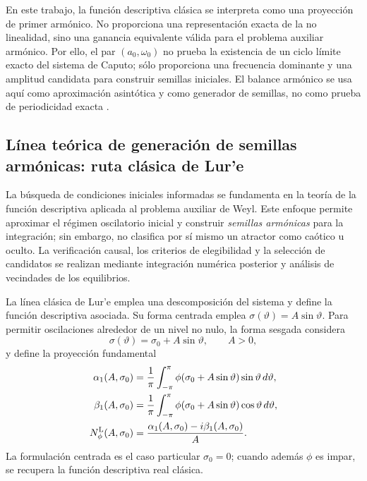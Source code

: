 \documentclass[journal]{IEEEtran}
\begin{document}
En este trabajo, la función descriptiva clásica se interpreta como una
proyección de primer armónico. No proporciona una representación exacta de
la no linealidad, sino una ganancia equivalente válida para el problema
auxiliar armónico. Por ello, el par \((a_0,\omega_0)\) no prueba la
existencia de un ciclo límite exacto del sistema de Caputo; sólo proporciona
una frecuencia dominante y una amplitud candidata para construir semillas
iniciales. El balance armónico se usa aquí como
aproximación asintótica y como generador de semillas, no como prueba de
periodicidad exacta \cite{TavazoeiHaeri2009,KaslikSivasundaram2012,Vigue2019,Haacker2026}.

\subsection{Línea teórica de generación de semillas armónicas: ruta clásica de Lur'e}
\label{subsec:lure_df_teoria}

La búsqueda de condiciones iniciales informadas se fundamenta en la teoría de la función descriptiva aplicada al problema auxiliar de Weyl. Este enfoque permite aproximar el régimen oscilatorio inicial y construir \emph{semillas armónicas} para la integración; sin embargo, no clasifica por sí mismo un atractor como caótico u oculto. La verificación causal, los criterios de elegibilidad y la selección de candidatos se realizan mediante integración numérica posterior y análisis de vecindades de los equilibrios.

La línea clásica de Lur'e emplea una descomposición del sistema y define la función descriptiva asociada. Su forma centrada emplea \(\sigma(\vartheta)=A\sin\vartheta\). Para permitir oscilaciones alrededor de un nivel no nulo, la forma sesgada considera
\begin{equation}
\label{eq:biased_input_theory}
\sigma(\vartheta)=\sigma_0+A\sin\vartheta,
\qquad A>0,
\end{equation}
y define la proyección fundamental
\begin{equation}
\label{eq:biased_df_theory}
\begin{aligned}
\alpha_1(A,\sigma_0)
&=\frac{1}{\pi}\int_{-\pi}^{\pi}
\phi(\sigma_0+A\sin\vartheta)\sin\vartheta\,d\vartheta,\\
\beta_1(A,\sigma_0)
&=\frac{1}{\pi}\int_{-\pi}^{\pi}
\phi(\sigma_0+A\sin\vartheta)\cos\vartheta\,d\vartheta,\\
N_{\phi}^{\rm L}(A,\sigma_0)
&=\frac{\alpha_1(A,\sigma_0)-i\beta_1(A,\sigma_0)}{A}.
\end{aligned}
\end{equation}
La formulación centrada es el caso particular \(\sigma_0=0\); cuando además \(\phi\) es impar, se recupera la función descriptiva real clásica. 
\end{document}
